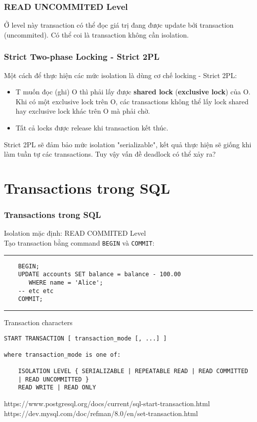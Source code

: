 \documentclass[xcolor={table, dvipsnames}]{beamer}
\begin{document}
\begin{frame}
\frametitle{READ UNCOMMITED Level}
Ở level này transaction có thể đọc giá trị đang được update bởi transaction (uncommited). Có thể coi là transaction không cần isolation.
\end{frame}

\begin{frame}
\frametitle{Strict Two-phase Locking - Strict 2PL}
Một cách để thực hiện các mức isolation là dùng cơ chế locking - Strict 2PL:
\begin{itemize}
\item T muốn đọc (ghi) O thì phải lấy được \textbf{shared lock} (\textbf{exclusive lock}) của O. Khi có một exclusive lock trên O, các transactions không thể lấy lock shared hay exclusive lock khác trên O mà phải chờ.
\item Tất cả locks được release khi transaction kết thúc.
\end{itemize}
Strict 2PL sẽ đảm bảo mức isolation "serializable", kết quả thực hiện sẽ giống khi làm tuần tự các transactions. Tuy vậy vấn đề deadlock có thể xảy ra?
\end{frame}

\section{Transactions trong SQL}
\begin{frame}[fragile]
\frametitle{Transactions trong SQL}
Isolation mặc định: READ COMMITED Level\\
Tạo transaction bằng command \verb|BEGIN| và \verb|COMMIT|:
\rule{\textwidth}{1pt}
\scriptsize
\begin{verbatim}
    BEGIN;
    UPDATE accounts SET balance = balance - 100.00
       WHERE name = 'Alice';
    -- etc etc
    COMMIT;
\end{verbatim}
\rule{\textwidth}{1pt}

\begin{block}{Transaction characters}
\begin{verbatim}
START TRANSACTION [ transaction_mode [, ...] ]

where transaction_mode is one of:

    ISOLATION LEVEL { SERIALIZABLE | REPEATABLE READ | READ COMMITTED 
    | READ UNCOMMITTED }
    READ WRITE | READ ONLY
\end{verbatim}
    
https://www.postgresql.org/docs/current/sql-start-transaction.html\\
https://dev.mysql.com/doc/refman/8.0/en/set-transaction.html
\end{block}
\end{frame}
\end{document}
